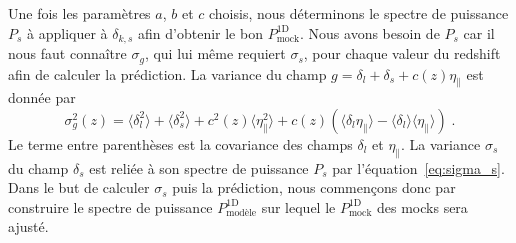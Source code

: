 Une fois les paramètres $a$, $b$ et $c$ choisis, nous déterminons le spectre de puissance $P_{s}$ à appliquer à $\delta_{k,s}$ afin d'obtenir le bon $P_{\mathrm{mock}}^{\mathrm{1D}}$.
Nous avons besoin de $P_{s}$ car il nous faut connaître $\sigma_g$, qui lui même requiert $\sigma_s$, pour chaque valeur du redshift afin de calculer la prédiction.
La variance du champ $g = \delta_l + \delta_s + c(z)\eta_{\parallel}$ est donnée par
\begin{equation}
  \label{eq:sigma_g}
  \sigma_g^2(z) = \langle \delta_l^2 \rangle + \langle \delta_s^2 \rangle + c^2(z) \langle \eta_{\parallel}^2 \rangle +
  c(z) \left( \langle \delta_l \eta_{\parallel} \rangle - \langle \delta_l \rangle \langle \eta_{\parallel} \rangle \right)\; .
\end{equation}
Le terme entre parenthèses est la covariance des champs $\delta_l$ et $\eta_{\parallel}$.
La variance $\sigma_s$ du champ $\delta_s$ est reliée à son spectre de puissance $P_{s}$ par l'équation~\ref{eq:sigma_s}.
Dans le but de calculer $\sigma_s$ puis la prédiction,
nous commençons donc par construire le spectre de puissance $P^{\mathrm{1D}}_{\mathrm{modèle}}$ sur lequel le $P_{\mathrm{mock}}^{\mathrm{1D}}$ des mocks sera ajusté.
